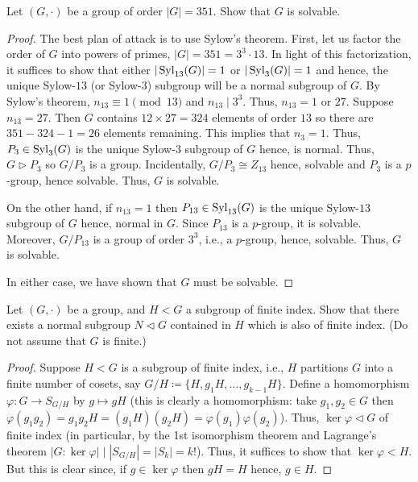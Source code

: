 \begin{problem}
Let $(G,\cdot)$ be a group of order $|G|=351$. Show that $G$ is solvable.
\end{problem}
\begin{proof}
The best plan of attack is to use Sylow's theorem. First, let us factor the
order of $G$ into powers of primes, $|G|=351=3^3\cdot 13$. In light of this
factorization, it suffices to show that either $|\operatorname{Syl}_{13}(G)|=1$ or
$|\operatorname{Syl}_3(G)|=1$ and hence, the unique Sylow-$13$ (or Sylow-$3$) subgroup
will be a normal subgroup of $G$. By Sylow's theorem, $n_{13}\equiv
1\pmod{13}$ and $n_{13}\mid 3^3$. Thus, $n_{13}=1$ or $27$. Suppose
$n_{13}=27$. Then $G$ contains $12\times 27=324$ elements of order $13$ so
there are $351-324-1=26$ elements remaining. This implies that
$n_3=1$. Thus, $P_3\in\operatorname{Syl}_3(G)$ is the unique Sylow-$3$ subgroup of $G$
hence, is normal. Thus, $G\rhd P_3$ so $G/P_3$ is a group. Incidentally,
$G/P_3\cong Z_{13}$ hence, solvable and $P_3$ is a $p$-group, hence
solvable. Thus, $G$ is solvable.

On the other hand, if $n_{13}=1$ then $P_{13}\in\operatorname{Syl}_{13}(G)$ is the unique
Sylow-$13$ subgroup of $G$ hence, normal in $G$. Since $P_{13}$ is a
$p$-group, it is solvable. Moreover, $G/P_{13}$ is a group of order $3^3$,
i.e., a $p$-group, hence, solvable. Thus, $G$ is solvable.

In either case, we have shown that $G$ must be solvable.
\end{proof}

\begin{problem}
Let $(G,\cdot)$ be a group, and $H<G$ a subgroup of finite index. Show that
there exists a normal subgroup $N\lhd G$ contained in $H$ which is also of
finite index. (Do not assume that $G$ is finite.)
\end{problem}
\begin{proof}
Suppose $H<G$ is a subgroup of finite index, i.e., $H$ partitions $G$ into
a finite number of cosets, say $G/H\coloneqq
\{H,g_1H,...,g_{k-1}H\}$. Define a homomorphism $\varphi\colon G\to
S_{G/H}$ by $g\mapsto gH$ (this is clearly a homomorphism: take $g_1,g_2\in
G$ then
$\varphi(g_1g_2)=g_1g_2H=(g_1H)(g_2H)=\varphi(g_1)\varphi(g_2)$). Thus,
$\ker\varphi\lhd G$ of finite index (in particular, by the 1st isomorphism
theorem and Lagrange's theorem $|G:\ker\varphi|\mid
|S_{G/H}|=|S_k|=k!$). Thus, it suffices to show that $\ker\varphi<H$. But
this is clear since, if $g\in\ker\varphi$ then $gH=H$ hence, $g\in H$.
\end{proof}

